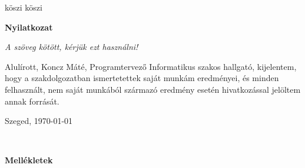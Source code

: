 \documentclass[a4paper,12pt]{report}
\theoremstyle{definition}
\theoremstyle{remark}
\begin{document}
\vspace{2 cm}

köszi köszi

\newpage
{\Huge \bf Nyilatkozat}


\vspace{2 cm}

{\it A szöveg kötött, kérjük ezt használni!}

Alulírott, Koncz Máté, Programtervező Informatikus szakos hallgató, kijelentem, hogy a szakdolgozatban ismertetettek saját munkám eredményei, és minden felhasznált, nem saját munkából származó eredmény esetén hivatkozással jelöltem annak forrását. 


\begin{flushleft}
\vspace*{1cm}
Szeged, \today
\end{flushleft}

\begin{flushright}
 \vspace*{1cm}
 \makebox[7cm]{\rule{6cm}{.4pt}}\\
\end{flushright}

\pagebreak

\newpage
{\Huge \bf Mellékletek}


\vspace{2 cm}
\end{document}
